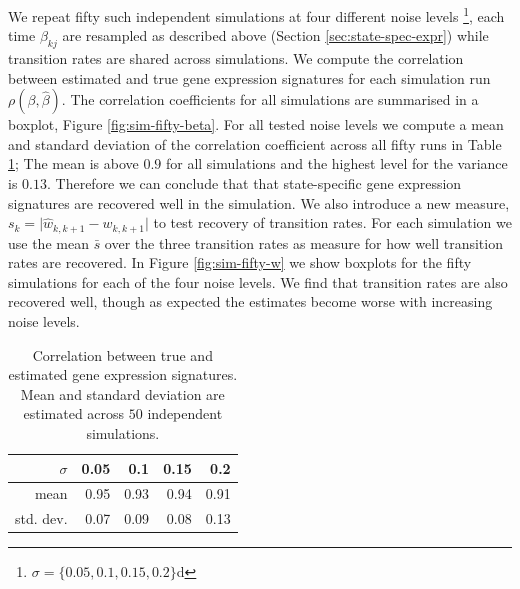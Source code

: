 We repeat fifty such independent simulations at four different noise levels \footnote{$\sigma=\lbrace 0.05, 0.1, 0.15, 0.2 \rbrace$d}, each time $\beta_{kj}$ are resampled as described above (Section \ref{sec:state-spec-expr}) while transition rates are shared across simulations. We compute the correlation between estimated and true gene expression signatures for each simulation run $\rho(\beta,\hat{\beta})$. The correlation coefficients for all simulations are summarised in a boxplot, Figure \ref{fig:sim-fifty-beta}. For all tested noise levels we compute a mean and standard deviation of the correlation coefficient across all fifty runs in Table \ref{tab:cor-beta-fifty}; The mean is above $0.9$ for all simulations and the highest level for the variance is $0.13$. Therefore we can conclude that that state-specific gene expression signatures are recovered well in the simulation. We also introduce a new measure, $s_k = \lvert \hat{w}_{k,k+1} - w_{k,k+1} \rvert$ to test recovery of transition rates. For each simulation we use the mean $\bar{s}$ over the three transition rates as measure for how well transition rates are recovered. In Figure \ref{fig:sim-fifty-w} we show boxplots for the fifty simulations for each of the four noise levels. We find that transition rates are also recovered well, though as expected the estimates become worse with increasing noise levels.

\begin{table}[ht]
\centering
\begin{tabular}{rrrrr}
  \hline
$\sigma$ & 0.05 & 0.1 & 0.15 & 0.2 \\ 
  \hline
mean & 0.95 & 0.93 & 0.94 & 0.91 \\ 
std. dev. & 0.07 & 0.09 & 0.08 & 0.13 \\ 
   \hline
 \end{tabular}
 \caption{Correlation between true and estimated gene expression signatures. Mean and standard deviation are estimated across $50$ independent simulations.}
 \label{tab:cor-beta-fifty}
\end{table}

